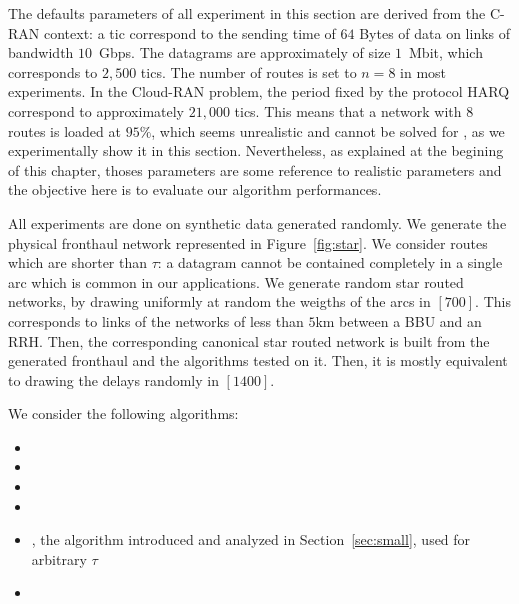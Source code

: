   The defaults parameters of all experiment in this section are derived from the C-RAN context: a tic correspond to the sending time of $64$ Bytes of data on links of bandwidth $10$~Gbps. The datagrams are approximately of size $1$~Mbit, which corresponds to $2,500$ tics. The number of routes is set to $n = 8$ in most experiments. In the Cloud-RAN problem, the period fixed by the protocol HARQ correspond to approximately $21,000$ tics. This means that a network with $8$ routes is loaded at $95\%$, which seems unrealistic and cannot be solved for \pazl, as we experimentally show it in this section. Nevertheless, as explained at the begining of this chapter, thoses parameters are some reference to realistic parameters and the objective here is to evaluate our algorithm performances.

     All experiments are done on synthetic data generated randomly. We generate the physical fronthaul
     network represented in Figure~\ref{fig:star}. We consider routes which are shorter than $\tau$: a datagram cannot be contained completely in a single arc which is common in our applications. We generate random star routed networks, by drawing uniformly at random the weigths of the arcs in $[700]$. This corresponds to links of the networks of less than $5$km between a BBU and an RRH. Then, the corresponding canonical star routed network is built from the generated fronthaul and the algorithms tested on it. Then, it is mostly equivalent to drawing the delays randomly in $[1400]$.

     We consider the following algorithms:
\begin{itemize}
  \item \firstfit
  \item \metaoffset
  \item \compactpair
  \item \compactfit
  \item \greedyuniform, the algorithm introduced and analyzed in Section~\ref{sec:small}, used for arbitrary $\tau$
  \item \exactresolution 
\end{itemize}


